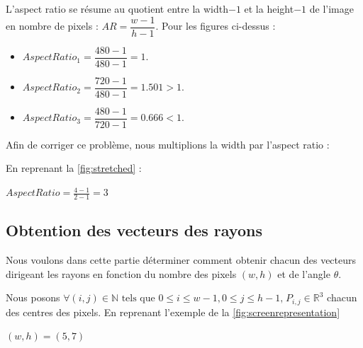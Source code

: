 L'aspect ratio se résume au quotient entre la width$-1$ et la height$-1$ de l'image en nombre de pixels : $AR=\dfrac{w-1}{h-1}$. Pour les figures ci-dessus : 

\begin{itemize}
    \item $AspectRatio_1 = \dfrac{480-1}{480-1} = 1$. \vspace{3pt}
    \item $AspectRatio_2 = \dfrac{720-1}{480-1} = 1.501 > 1$. \vspace{3pt}
    \item $AspectRatio_3 = \dfrac{480-1}{720-1} = 0.666 < 1$. \vspace{3pt}
\end{itemize}

Afin de corriger ce problème, nous multiplions la width par l'aspect ratio :

En reprenant la \autoref{fig:stretched} :

\begin{center}
$AspectRatio = \frac{4-1}{2-1} = 3$ \vspace{3pt}
\end{center}

\unstretched

\subsection{Obtention des vecteurs des rayons}
Nous voulons dans cette partie déterminer comment obtenir chacun des vecteurs dirigeant les rayons en fonction du nombre des pixels $(w,h)$ et de l'angle $\theta$.

Nous posons $\forall (i,j) \in \mathbb{N} \text{ tels que } 0\leq i\leq w-1, 0\leq j\leq h-1 \text{,} \; P_{i,j} \in \mathbb{R}^3$ chacun des centres des pixels. En reprenant l'exemple de la \autoref{fig:screenrepresentation}

\begin{center}
\hspace*{0.3cm}
\small $(w,h)=(5,7)$
\end{center}

